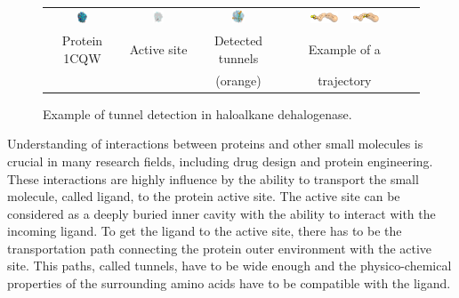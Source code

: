 \documentclass{svmult}
\begin{document}
\begin{figure}[t]
\centering
{\footnotesize
\renewcommand{\arraystretch}{0.1}
\renewcommand{\tabcolsep}{0pt}
\begin{tabular}{ccccc}
\includegraphics[width=0.15\textwidth]{fig/motiv1} &
\includegraphics[width=0.17\textwidth]{fig/motiv2lab} &
\includegraphics[width=0.16\textwidth]{fig/motiv3} &
\hbox{
\vbox{
\hbox{\includegraphics[width=0.25\textwidth]{fig/ta-1} }
\hbox{\includegraphics[width=0.25\textwidth]{fig/ta-433}}
} 
}
\\
Protein 1CQW & Active site & Detected tunnels & Example of a  \\
             &            & (orange)          & trajectory
\end{tabular}
}
\caption{\label{fig::motiv}
    Example of tunnel detection in haloalkane dehalogenase.
}
\end{figure}

Understanding of interactions between proteins and other small molecules is crucial in many research fields, including drug design and protein engineering. 
These interactions are highly influence by the ability to transport the small molecule, called ligand, to the protein active site.
The active site can be considered as a deeply buried inner cavity with the ability to interact with the incoming ligand.
To get the ligand to the active site, there has to be the transportation path connecting the protein outer environment with the active site.
This paths, called tunnels, have to be wide enough and the physico-chemical properties of the surrounding amino acids have to be compatible with the ligand. 
\end{document}
